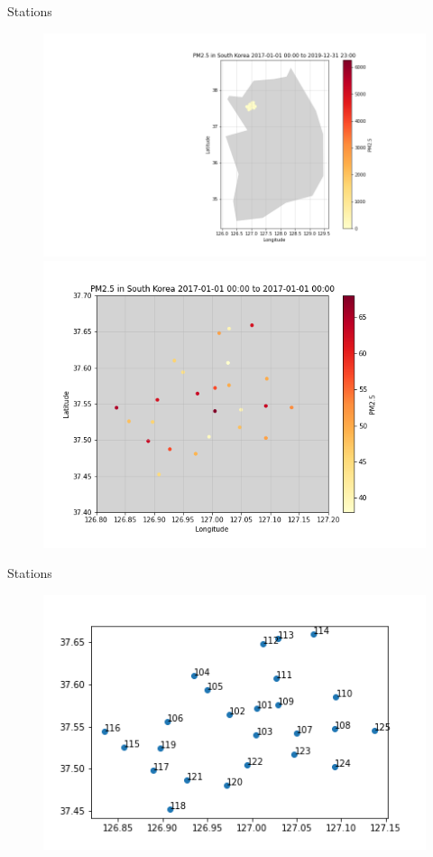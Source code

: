 \documentclass{beamer}
\begin{document}
	\begin{frame}{Stations}
		\begin{figure}
				\includegraphics[scale=0.2]{korea_station.png}
				\includegraphics[scale=0.22]{station_pm.png}
		\end{figure}
	\end{frame}

	\begin{frame}{Stations}
		\begin{figure}
			\includegraphics[scale=0.5]{station_code.png}
		\end{figure}
	\end{frame}
\end{document}
